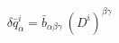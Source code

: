 \begin{equation}
\delta \bar{q}_\alpha^i = \bar{b}_{\alpha\beta\gamma} ~(D^i)^{\beta\gamma} \nonumber
\end{equation}

